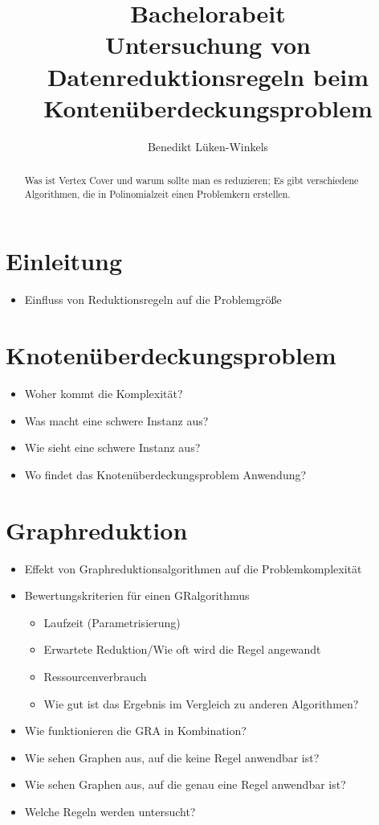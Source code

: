 \documentclass[a4paper]{article}
\begin{document}
\title{Bachelorabeit\\ Untersuchung von Datenreduktionsregeln beim  Kontenüberdeckungsproblem}
\author{Benedikt Lüken-Winkels}
\maketitle
\tableofcontents
\newpage
\begin{abstract}
Was ist Vertex Cover und warum sollte man es reduzieren; Es gibt verschiedene Algorithmen, die in Polinomialzeit einen Problemkern erstellen.
\end{abstract}
\section{Einleitung}
\begin{itemize}
\item Einfluss von Reduktionsregeln auf die Problemgröße
\end{itemize}


\section{Knotenüberdeckungsproblem}
\begin{itemize}
\item Woher kommt die Komplexität?
\item Was macht eine schwere Instanz aus?
\item Wie sieht eine schwere Instanz aus?
\item Wo findet das Knotenüberdeckungsproblem Anwendung?
\end{itemize}

\section{Graphreduktion}
\begin{itemize}
\item Effekt von Graphreduktionsalgorithmen auf die Problemkomplexität
\item Bewertungskriterien für einen GRalgorithmus
	\begin{itemize}
	\item Laufzeit (Parametrisierung)
	\item Erwartete Reduktion/Wie oft wird die Regel angewandt
	\item Ressourcenverbrauch
	\item Wie gut ist das Ergebnis im Vergleich zu anderen Algorithmen?	
	\end{itemize}
\item Wie funktionieren die GRA in Kombination?
\item Wie sehen Graphen aus, auf die keine Regel anwendbar ist?
\item Wie sehen Graphen aus, auf die genau eine Regel anwendbar ist?
\item Welche Regeln werden untersucht?
\end{itemize}
\end{document}
